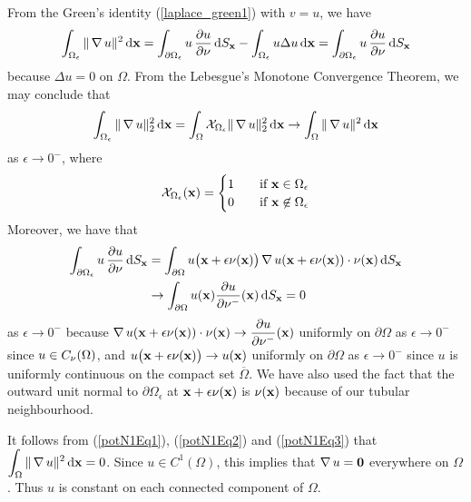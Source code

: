 From the Green's identity (\ref{laplace_green1}) with $v=u$, we have
\begin{equation} \label{potN1Eq1}
\int_{\Omega_\epsilon} \| \operatorname{\nabla} u \|^2 \,\mathrm{d}{\mathbf{x}} =
\int_{\partial \Omega_\epsilon} u\,\frac{\partial{u}}{\partial \mathbf{\nu}} \,\mathrm{d}{S}_{\mathbf{x}}
- \int_{\Omega_\epsilon} u \Delta u \,\mathrm{d}{\mathbf{x}}  =
\int_{\partial \Omega_\epsilon} u\,\frac{\partial{u}}{\partial \mathbf{\nu}} \,\mathrm{d}{S}_{\mathbf{x}}
\end{equation}
because $\Delta u = 0$ on $\Omega$.  From the Lebesgue's Monotone
Convergence Theorem, we may conclude that
\begin{equation} \label{potN1Eq2}
\int_{\Omega_\epsilon} \| \operatorname{\nabla} u \|_2^2 \,\mathrm{d}{\mathbf{x}}
= \int_\Omega \mathcal{X}_{\Omega_\epsilon} \| \operatorname{\nabla} u \|_2^2 \,\mathrm{d}{\mathbf{x}}
\rightarrow \int_\Omega \| \operatorname{\nabla} u \|^2 \,\mathrm{d}{\mathbf{x}}
\end{equation}
as $\epsilon \rightarrow 0^-$,  where
\[
\mathcal{X}_{\Omega_\epsilon}(\mathbf{x}) =
\begin{cases}
1 & \quad \text{if} \ \mathbf{x} \in \Omega_\epsilon \\
0 & \quad \text{if} \ \mathbf{x} \not\in \Omega_\epsilon
\end{cases}
\]
Moreover, we have that
\begin{equation} \label{potN1Eq3}
\begin{split}
\int_{\partial \Omega_\epsilon} u\,\frac{\partial{u}}{\partial \mathbf{\nu}} \,\mathrm{d}{S}_{\mathbf{x}}
&= \int_{\partial \Omega} u\big(\mathbf{x} + \epsilon \mathbf{\nu}(\mathbf{x})\big)
\operatorname{\nabla} u(\mathbf{x} + \epsilon \mathbf{\nu}(\mathbf{x})) \cdot \mathbf{\nu}(\mathbf{x}) 
\,\mathrm{d}{S}_{\mathbf{x}} \\
&\rightarrow \int_{\partial \Omega} u(\mathbf{x}) \frac{\partial{u}}{\partial \mathbf{\nu}^-}(\mathbf{x})
\,\mathrm{d}{S}_{\mathbf{x}} = 0
\end{split}
\end{equation}
as $\epsilon \rightarrow 0^-$ because
$\displaystyle
\operatorname{\nabla} u(\mathbf{x} + \epsilon \mathbf{\nu}(\mathbf{x})) \cdot \mathbf{\nu}(\mathbf{x})
\to \frac{\partial{u}}{\partial \mathbf{\nu}^-}(\mathbf{x})$ uniformly on $\partial \Omega$ as
$\epsilon \to 0^-$ since $u \in C_{\mathbf{\nu}}(\Omega)$, and
$\displaystyle u\big(\mathbf{x} + \epsilon \mathbf{\nu}(\mathbf{x})\big) \to
u(\mathbf{x})$ uniformly on $\partial \Omega$ as $\epsilon \to 0^-$
since $u$ is uniformly continuous on the compact set $\overline{\Omega}$.
We have also used the fact that the outward unit normal to
$\partial \Omega_\epsilon$ at
$\mathbf{x} + \epsilon \mathbf{\nu}(\mathbf{x})$ is $\mathbf{\nu}(\mathbf{x})$
because of our tubular neighbourhood.

It follows from (\ref{potN1Eq1}), (\ref{potN1Eq2}) and (\ref{potN1Eq3})
that $\displaystyle \int_\Omega \| \operatorname{\nabla} u \|^2 \,\mathrm{d}{\mathbf{x}} = 0$.
Since $\displaystyle u \in C^1(\Omega)$, this implies that $\operatorname{\nabla} u = \mathbf{0}$
everywhere on $\Omega$.  Thus $u$ is constant on each connected
component of $\Omega$.

